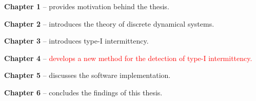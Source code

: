 \begin{description}
	\item \textbf{Chapter 1} -- provides motivation behind the thesis.
	\item \textbf{Chapter 2} -- introduces the theory of discrete dynamical systems.
	\item \textbf{Chapter 3} -- introduces type-I intermittency.
	\item \textbf{Chapter 4} -- \textcolor{red}{develops a new method for the detection of type-I intermittency.}
	\item \textbf{Chapter 5} -- discusses the software implementation.
	\item \textbf{Chapter 6} -- concludes the findings of this thesis.
\end{description}

\endinput